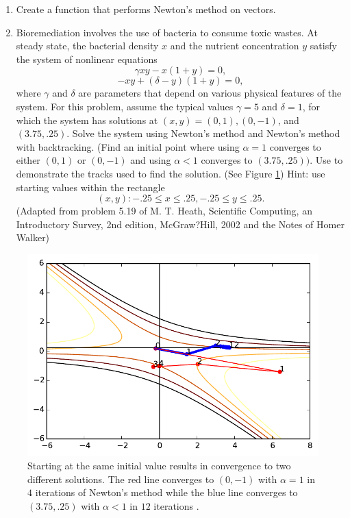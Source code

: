 \begin{problem}
\begin{enumerate}

\item Create a  function that performs Newton's method on vectors.
\item Bioremediation involves the use of bacteria to consume toxic wastes.
At steady state, the bacterial density $x$ and the nutrient concentration $y$ satisfy the system of nonlinear equations
\[
\gamma xy - x(1 + y) = 0,
\]
\[
 -xy + (\delta - y)(1 + y) = 0,
\]
where $\gamma$ and $\delta$ are parameters that depend on various physical features of the system.
For this problem, assume the typical values $\gamma = 5$ and $\delta = 1$, for which the system has solutions at $(x, y) = (0, 1), (0, -1)$, and $(3.75, .25)$.
Solve the system using Newton's method and Newton's method with backtracking.
(Find an initial point where using $\alpha = 1$ converges to either $(0, 1)$ or $(0, -1)$ and using $\alpha < 1$ converges to $(3.75, .25)).$
Use  to demonstrate the tracks used to find the solution. (See Figure \ref{fig:contour_plot})
Hint: use starting values within the rectangle
\[
{(x, y) : -.25 \leqslant x \leqslant .25, -.25 \leqslant y \leqslant .25}.
\]
(Adapted from problem 5.19 of M. T. Heath, Scientific Computing, an Introductory Survey, 2nd edition, McGraw?Hill, 2002 and the Notes of Homer Walker)
\end{enumerate}
\end{problem}

\begin{figure}[h]
\centering
\includegraphics[width=\textwidth]{figures/contour.pdf}
\caption{Starting at the same initial value results in convergence to two different solutions.  The red line converges to $(0,-1)$ with $\alpha = 1$ in $4$ iterations of Newton's method while the blue line converges to $(3.75,.25)$ with $\alpha < 1$ in $12$ iterations .}
\label{fig:contour_plot}
\end{figure}

